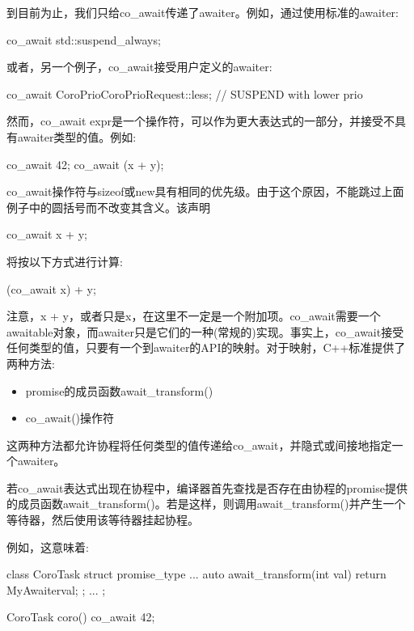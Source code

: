 
到目前为止，我们只给co\_await传递了awaiter。例如，通过使用标准的awaiter:

\begin{cpp}
co_await std::suspend_always{};
\end{cpp}

或者，另一个例子，co\_await接受用户定义的awaiter:

\begin{cpp}
co_await CoroPrio{CoroPrioRequest::less}; // SUSPEND with lower prio
\end{cpp}

然而，co\_await expr是一个操作符，可以作为更大表达式的一部分，并接受不具有awaiter类型的值。例如:

\begin{cpp}
co_await 42;
co_await (x + y);
\end{cpp}

co\_await操作符与sizeof或new具有相同的优先级。由于这个原因，不能跳过上面例子中的圆括号而不改变其含义。该声明

\begin{cpp}
co_await x + y;
\end{cpp}

将按以下方式进行计算:

\begin{cpp}
(co_await x) + y;
\end{cpp}

注意，x + y，或者只是x，在这里不一定是一个附加项。co\_await需要一个awaitable对象，而awaiter只是它们的一种(常规的)实现。事实上，co\_await接受任何类型的值，只要有一个到awaiter的API的映射。对于映射，C++标准提供了两种方法:

\begin{itemize}
\item 
promise的成员函数await\_transform()

\item 
co\_await()操作符
\end{itemize}

这两种方法都允许协程将任何类型的值传递给co\_await，并隐式或间接地指定一个awaiter。



若co\_await表达式出现在协程中，编译器首先查找是否存在由协程的promise提供的成员函数await\_transform()。若是这样，则调用await\_transform()并产生一个等待器，然后使用该等待器挂起协程。

例如，这意味着:

\begin{cpp}
class CoroTask {
	struct promise_type {
		...
		auto await_transform(int val) {
			return MyAwaiter{val};
		}
	};
	...
};

CoroTask coro()
{
	co_await 42;
}
\end{cpp}

